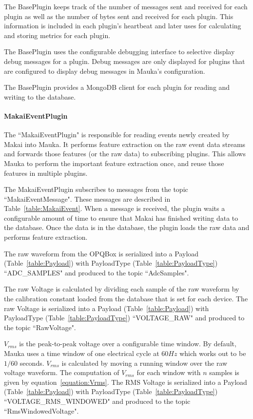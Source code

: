 The BasePlugin keeps track of the number of messages sent and received for each plugin as well as the number of bytes sent and received for each plugin. This information is included in each plugin's heartbeat and later uses for calculating and storing metrics for each plugin.

The BasePlugin uses the configurable debugging interface to selective display debug messages for a plugin. Debug messages are only displayed for plugins that are configured to display debug messages in Mauka's configuration.

The BasePlugin provides a MongoDB client for each plugin for reading and writing to the database.

\paragraph{MakaiEventPlugin} The ``MakaiEventPlugin" is responsible for reading events newly created by Makai into Mauka. It performs feature extraction on the raw event data streams and forwards those features (or the raw data) to subscribing plugins. This allows Mauka to perform the important feature extraction once, and reuse those features in multiple plugins.

The MakaiEventPlugin subscribes to messages from the topic ``MakaiEventMessage". These messages are described in Table~\ref{table:MakaiEvent}. When a message is received, the plugin waits a configurable amount of time to ensure that Makai has finished writing data to the database. Once the data is in the database, the plugin loads the raw data and performs feature extraction.

The raw waveform from the OPQBox is serialized into a Payload (Table~\ref{table:Payload}) with PayloadType (Table~\ref{table:PayloadType}) ``ADC\_SAMPLES" and produced to the topic ``AdcSamples".

The raw Voltage is calculated by dividing each sample of the raw waveform by the calibration constant loaded from the database that is set for each device. The raw Voltage  is serialized into a Payload (Table~\ref{table:Payload}) with PayloadType (Table~\ref{table:PayloadType}) ``VOLTAGE\_RAW" and produced to the topic ``RawVoltage".

$V_{rms}$ is the peak-to-peak voltage over a configurable time window. By default, Mauka uses a time window of one electrical cycle at 60$Hz$ which works out to be $1/60$ seconds. $V_{rms}$ is calculated by moving a running window over the raw voltage waveform. The computation of $V_{rms}$ for each window with $n$ samples is given by equation~\ref{equation:Vrms}. The RMS Voltage  is serialized into a Payload (Table~\ref{table:Payload}) with PayloadType (Table~\ref{table:PayloadType}) ``VOLTAGE\_RMS\_WINDOWED" and produced to the topic ``RmsWindowedVoltage".

